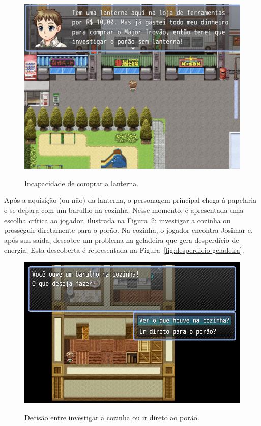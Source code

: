 \begin{figure}[!htbp]
	\centering
	\caption{Incapacidade de comprar a lanterna.}
	\includegraphics[scale=0.4]{Textuais/Pictures/nao-compra-lanterna.png}
	\label{fig:nao-compra-lanterna}
\end{figure}

Após a aquisição (ou não) da lanterna, o personagem principal chega à papelaria e se depara com um barulho na cozinha. Nesse momento, é apresentada uma escolha crítica ao jogador, ilustrada na Figura~\ref{fig:chega-cozinha-papelaria}: investigar a cozinha ou prosseguir diretamente para o porão. Na cozinha, o jogador encontra Josimar e, após sua saída, descobre um problema na geladeira que gera desperdício de energia. Esta descoberta é representada na Figura~\ref{fig:desperdicio-geladeira}.

\begin{figure}[!htbp]
	\centering
	\caption{Decisão entre investigar a cozinha ou ir direto ao porão.}
	\includegraphics[scale=0.45]{Textuais/Pictures/chega-cozinha-papelaria.png}
	\label{fig:chega-cozinha-papelaria}
\end{figure}

